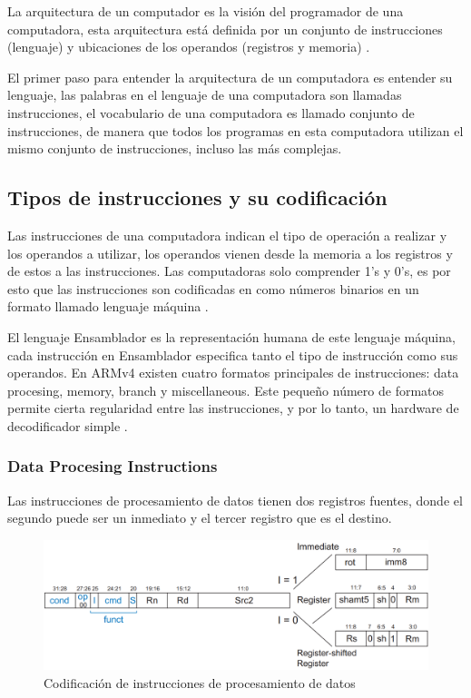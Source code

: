 \documentclass[journal,trans]{IEEEtran}
\begin{document}
	La arquitectura de un computador es la visión del programador de una computadora, esta arquitectura está definida por un conjunto de instrucciones (lenguaje) y ubicaciones de los operandos (registros y memoria) \cite{SarahLHarris2010}. 
	
	El primer paso para entender la arquitectura de un computadora es entender su lenguaje, las palabras en el lenguaje de una computadora son llamadas instrucciones, el vocabulario de una computadora es llamado conjunto de instrucciones, de manera que todos los programas en esta computadora utilizan el mismo conjunto de instrucciones, incluso las más complejas.
	
	\subsection{Tipos de instrucciones y su codificación}
	Las instrucciones de una computadora indican el tipo de operación a realizar y los operandos a utilizar, los operandos vienen desde la memoria a los registros y de estos a las instrucciones. Las computadoras solo comprender 1's y 0's, es por esto que las instrucciones son codificadas en como números binarios en un formato llamado lenguaje máquina \cite{SarahLHarris2010}.
	
	El lenguaje Ensamblador es la representación humana de este lenguaje máquina, cada instrucción en Ensamblador especifica tanto el tipo de instrucción como sus operandos. En ARMv4 existen cuatro formatos principales de instrucciones: data procesing, memory, branch y miscellaneous. Este pequeño número de formatos permite cierta regularidad entre las instrucciones, y por lo tanto, un hardware de decodificador simple \cite{SarahLHarris2010}.
	
	\subsubsection{Data Procesing Instructions}
	Las instrucciones de procesamiento de datos tienen dos registros fuentes, donde el segundo puede ser un inmediato y el tercer registro que es el destino. 
	
	\begin{figure}[h]
		\centering
		\includegraphics[width=\linewidth]{img/datapro.png}
		\caption{Codificación de instrucciones de procesamiento de datos \cite{SarahLHarris2010}}
		\label{fig:DataP}
	\end{figure}
\end{document}
